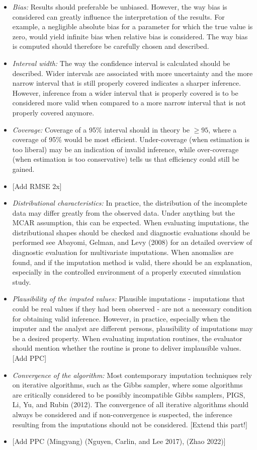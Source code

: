 \documentclass[
]{article}
\begin{document}
\begin{itemize}
\item
  \emph{Bias:} Results should preferable be unbiased. However, the way
  bias is considered can greatly influence the interpretation of the
  results. For example, a negligible absolute bias for a parameter for
  which the true value is zero, would yield infinite bias when relative
  bias is considered. The way bias is computed should therefore be
  carefully chosen and described.
\item
  \emph{Interval width:} The way the confidence interval is calculated
  should be described. Wider intervals are associated with more
  uncertainty and the more narrow interval that is still properly
  covered indicates a sharper inference. However, inference from a wider
  interval that is properly covered is to be considered more valid when
  compared to a more narrow interval that is not properly covered
  anymore.
\item
  \emph{Coverage:} Coverage of a 95\% interval should in theory be
  \(\geq 95\), where a coverage of 95\% would be most efficient.
  Under-coverage (when estimation is too liberal) may be an indication
  of invalid inference, while over-coverage (when estimation is too
  conservative) tells us that efficiency could still be gained.
\item
  {[}Add RMSE 2x{]}
\item
  \emph{Distributional characteristics:} In practice, the distribution
  of the incomplete data may differ greatly from the observed data.
  Under anything but the MCAR assumption, this can be expected. When
  evaluating imputations, the distributional shapes should be checked
  and diagnostic evaluations should be performed see Abayomi, Gelman,
  and Levy (2008) for an detailed overview of diagnostic evaluation for
  multivariate imputations. When anomalies are found, and if the
  imputation method is valid, there should be an explanation, especially
  in the controlled environment of a properly executed simulation study.
\item
  \emph{Plausibility of the imputed values:} Plausible imputations -
  imputations that could be real values if they had been observed - are
  not a necessary condition for obtaining valid inference. However, in
  practice, especially when the imputer and the analyst are different
  persons, plausibility of imputations may be a desired property. When
  evaluating imputation routines, the evaluator should mention whether
  the routine is prone to deliver implausible values. {[}Add PPC{]}
\item
  \emph{Convergence of the algorithm:} Most contemporary imputation
  techniques rely on iterative algorithms, such as the Gibbs sampler,
  where some algorithms are critically considered to be possibly
  incompatible Gibbs samplers, PIGS, Li, Yu, and Rubin (2012). The
  convergence of all iterative algorithms should always be considered
  and if non-convergence is suspected, the inference resulting from the
  imputations should not be considered. {[}Extend this part!{]}
\item
  {[}Add PPC (Mingyang) (Nguyen, Carlin, and Lee 2017), (Zhao 2022){]}
\end{itemize}
\end{document}
